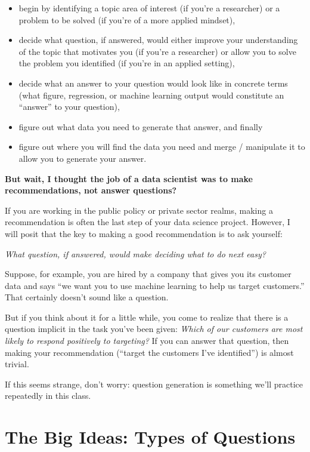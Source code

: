 \documentclass[12pt]{article}
\begin{document}
\begin{itemize}
	\item begin by identifying a topic area of interest (if you're a researcher) or a problem to be solved (if you're of a more applied mindset),
	\item decide what question, if answered, would either improve your understanding of the topic that motivates you (if you're a researcher) or allow you to solve the problem you identified (if you're in an applied setting),
	\item decide what an answer to your question would look like in concrete terms (what figure, regression, or machine learning output would constitute an ``answer'' to your question),
	\item figure out what data you need to generate that answer, and finally
	\item figure out where you will find the data you need and merge / manipulate it to allow you to generate your answer.
\end{itemize}

\textbf{But wait, I thought the job of a data scientist was to make recommendations, not answer questions?}

If you are working in the public policy or private sector realms, making a recommendation is often the last step of your data science project. However, I will posit that the key to making a good recommendation is to ask yourself:

\emph{What question, if answered, would make deciding what to do next easy?}

Suppose, for example, you are hired by a company that gives you its customer data and says ``we want you to use machine learning to help us target customers.'' That certainly doesn't sound like a question.

But if you think about it for a little while, you come to realize that there is a question implicit in the task you've been given: \emph{Which of our customers are most likely to respond positively to targeting?} If you can answer that question, then making your recommendation (``target the customers I've identified'') is almost trivial.

If this seems strange, don't worry: question generation is something we'll practice repeatedly in this class.


\section{The Big Ideas: Types of Questions}
\end{document}
